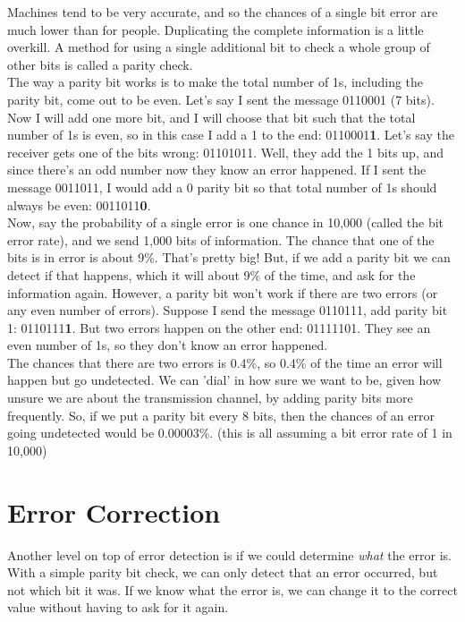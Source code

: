 Machines tend to be very accurate, and so the chances of a single bit error are much lower than for people. Duplicating the complete information is a little overkill. A method for using a single additional bit to check a whole group of other bits is called a parity check.\\

The way a parity bit works is to make the total number of 1s, including the parity bit, come out to be even. Let's say I sent the message 0110001 (7 bits). Now I will add one more bit, and I will choose that bit such that the total number of 1s is even, so in this case I add a 1 to the end: 0110001\textbf{1}. Let's say the receiver gets one of the bits wrong: 01101011. Well, they add the 1 bits up, and since there's an odd number now they know an error happened. If I sent the message 0011011, I would add a 0 parity bit so that total number of 1s should always be even: 0011011\textbf{0}.\\

Now, say the probability of a single error is one chance in 10,000 (called the bit error rate), and we send 1,000 bits of information. The chance that one of the bits is in error is about 9\%. That's pretty big! But, if we add a parity bit we can detect if that happens, which it will about 9\% of the time, and ask for the information again. However, a parity bit won't work if there are two errors (or any even number of errors). Suppose I send the message 0110111, add parity bit 1: 0110111\textbf{1}. But two errors happen on the other end: 01111101. They see an even number of 1s, so they don't know an error happened.\\

The chances that there are two errors is 0.4\%, so 0.4\% of the time an error will happen but go undetected. We can 'dial' in how sure we want to be, given how unsure we are about the transmission channel, by adding parity bits more frequently. So, if we put a parity bit every 8 bits, then the chances of an error going undetected would be 0.00003\%. (this is all assuming a bit error rate of 1 in 10,000)

\section{Error Correction}

Another level on top of error detection is if we could determine \textit{what} the error is. With a simple parity bit check, we can only detect that an error occurred, but not which bit it was. If we know what the error is, we can change it to the correct value without having to ask for it again.\\

